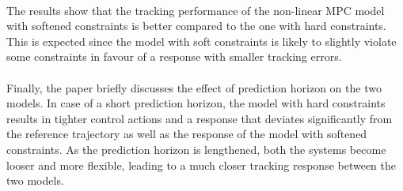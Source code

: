 \paragraph{}
The results show that the tracking performance of the non-linear MPC model with softened constraints is better compared to the one with hard constraints. This is expected since the model with soft constraints is likely to slightly violate some constraints in favour of a response with smaller tracking errors.

\paragraph{}
Finally, the paper briefly discusses the effect of prediction horizon on the two models. In case of a short prediction horizon, the model with hard constraints results in tighter control actions and a response that deviates significantly from the reference trajectory as well as the response of the model with softened constraints. As the prediction horizon is lengthened, both the systems become looser and more flexible, leading to a much closer tracking response between the two models. 